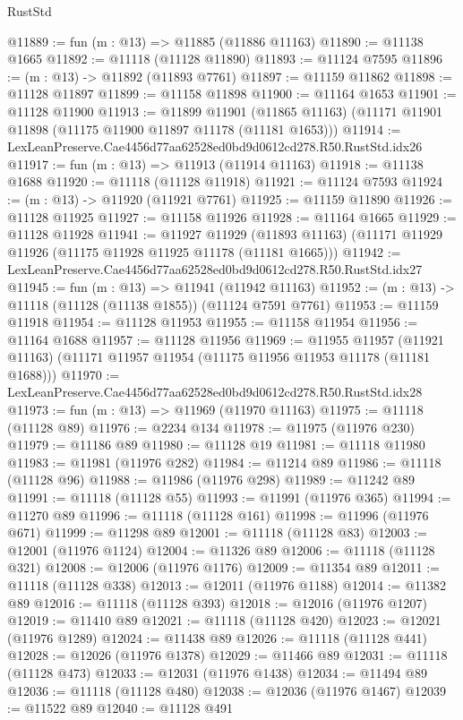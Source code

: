 \begin{lexlean}{RustStd}
\begin{coremodule}
@11889 := fun (m : @13) => @11885 (@11886 @11163)
@11890 := @11138 @1665
@11892 := @11118 (@11128 @11890)
@11893 := @11124 @7595
@11896 := (m : @13) -> @11892 (@11893 @7761)
@11897 := @11159 @11862
@11898 := @11128 @11897
@11899 := @11158 @11898
@11900 := @11164 @1653
@11901 := @11128 @11900
@11913 := @11899
    @11901
    (@11865 @11163)
    (@11171 @11901 @11898 (@11175 @11900 @11897 @11178 (@11181 @1653)))
@11914 := LexLeanPreserve.Cae4456d77aa62528ed0bd9d0612cd278.R50.RustStd.idx26
@11917 := fun (m : @13) => @11913 (@11914 @11163)
@11918 := @11138 @1688
@11920 := @11118 (@11128 @11918)
@11921 := @11124 @7593
@11924 := (m : @13) -> @11920 (@11921 @7761)
@11925 := @11159 @11890
@11926 := @11128 @11925
@11927 := @11158 @11926
@11928 := @11164 @1665
@11929 := @11128 @11928
@11941 := @11927
    @11929
    (@11893 @11163)
    (@11171 @11929 @11926 (@11175 @11928 @11925 @11178 (@11181 @1665)))
@11942 := LexLeanPreserve.Cae4456d77aa62528ed0bd9d0612cd278.R50.RustStd.idx27
@11945 := fun (m : @13) => @11941 (@11942 @11163)
@11952 := (m : @13) -> @11118 (@11128 (@11138 @1855)) (@11124 @7591 @7761)
@11953 := @11159 @11918
@11954 := @11128 @11953
@11955 := @11158 @11954
@11956 := @11164 @1688
@11957 := @11128 @11956
@11969 := @11955
    @11957
    (@11921 @11163)
    (@11171 @11957 @11954 (@11175 @11956 @11953 @11178 (@11181 @1688)))
@11970 := LexLeanPreserve.Cae4456d77aa62528ed0bd9d0612cd278.R50.RustStd.idx28
@11973 := fun (m : @13) => @11969 (@11970 @11163)
@11975 := @11118 (@11128 @89)
@11976 := @2234 @134
@11978 := @11975 (@11976 @230)
@11979 := @11186 @89
@11980 := @11128 @19
@11981 := @11118 @11980
@11983 := @11981 (@11976 @282)
@11984 := @11214 @89
@11986 := @11118 (@11128 @96)
@11988 := @11986 (@11976 @298)
@11989 := @11242 @89
@11991 := @11118 (@11128 @55)
@11993 := @11991 (@11976 @365)
@11994 := @11270 @89
@11996 := @11118 (@11128 @161)
@11998 := @11996 (@11976 @671)
@11999 := @11298 @89
@12001 := @11118 (@11128 @83)
@12003 := @12001 (@11976 @1124)
@12004 := @11326 @89
@12006 := @11118 (@11128 @321)
@12008 := @12006 (@11976 @1176)
@12009 := @11354 @89
@12011 := @11118 (@11128 @338)
@12013 := @12011 (@11976 @1188)
@12014 := @11382 @89
@12016 := @11118 (@11128 @393)
@12018 := @12016 (@11976 @1207)
@12019 := @11410 @89
@12021 := @11118 (@11128 @420)
@12023 := @12021 (@11976 @1289)
@12024 := @11438 @89
@12026 := @11118 (@11128 @441)
@12028 := @12026 (@11976 @1378)
@12029 := @11466 @89
@12031 := @11118 (@11128 @473)
@12033 := @12031 (@11976 @1438)
@12034 := @11494 @89
@12036 := @11118 (@11128 @480)
@12038 := @12036 (@11976 @1467)
@12039 := @11522 @89
@12040 := @11128 @491

\end{coremodule}
\end{lexlean}
